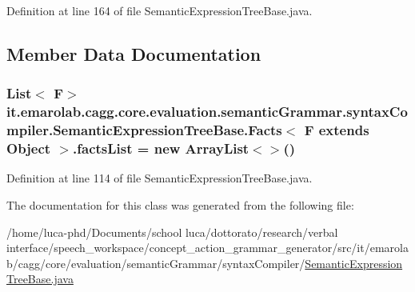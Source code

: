 Definition at line 164 of file Semantic\-Expression\-Tree\-Base.\-java.



\subsection{Member Data Documentation}
\hypertarget{classit_1_1emarolab_1_1cagg_1_1core_1_1evaluation_1_1semanticGrammar_1_1syntaxCompiler_1_1Semanta17363eb7db3bfea12328c626a3d6723_ab15dc4c7743f42af421fae7768c5eb54}{
\subsubsection[{facts\-List}]{\setlength{\rightskip}{0pt plus 5cm}List$<$ F$>$ it.\-emarolab.\-cagg.\-core.\-evaluation.\-semantic\-Grammar.\-syntax\-Compiler.\-Semantic\-Expression\-Tree\-Base.\-Facts$<$ F extends Object $>$.facts\-List = new Array\-List$<$$>$()\hspace{0.3cm}{\ttfamily [private]}}}\label{classit_1_1emarolab_1_1cagg_1_1core_1_1evaluation_1_1semanticGrammar_1_1syntaxCompiler_1_1Semanta17363eb7db3bfea12328c626a3d6723_ab15dc4c7743f42af421fae7768c5eb54}


Definition at line 114 of file Semantic\-Expression\-Tree\-Base.\-java.



The documentation for this class was generated from the following file\-:\begin{DoxyCompactItemize}
\item 
/home/luca-\/phd/\-Documents/school luca/dottorato/research/verbal interface/speech\-\_\-workspace/concept\-\_\-action\-\_\-grammar\-\_\-generator/src/it/emarolab/cagg/core/evaluation/semantic\-Grammar/syntax\-Compiler/\hyperlink{SemanticExpressionTreeBase_8java}{Semantic\-Expression\-Tree\-Base.\-java}\end{DoxyCompactItemize}
